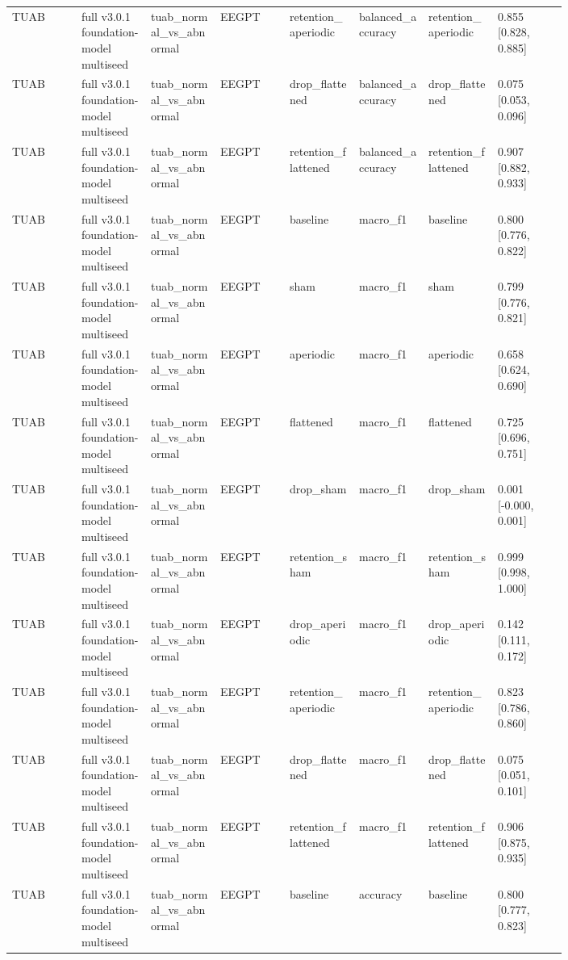 \begin{longtable}{p{0.10\linewidth}p{0.10\linewidth}p{0.10\linewidth}p{0.10\linewidth}p{0.10\linewidth}p{0.10\linewidth}p{0.10\linewidth}p{0.10\linewidth}}
TUAB & full v3.0.1 foundation-model multiseed & tuab\_normal\_vs\_abnormal & EEGPT & retention\_aperiodic & balanced\_accuracy & retention\_aperiodic & 0.855 [0.828, 0.885]\\
TUAB & full v3.0.1 foundation-model multiseed & tuab\_normal\_vs\_abnormal & EEGPT & drop\_flattened & balanced\_accuracy & drop\_flattened & 0.075 [0.053, 0.096]\\
TUAB & full v3.0.1 foundation-model multiseed & tuab\_normal\_vs\_abnormal & EEGPT & retention\_flattened & balanced\_accuracy & retention\_flattened & 0.907 [0.882, 0.933]\\
TUAB & full v3.0.1 foundation-model multiseed & tuab\_normal\_vs\_abnormal & EEGPT & baseline & macro\_f1 & baseline & 0.800 [0.776, 0.822]\\
TUAB & full v3.0.1 foundation-model multiseed & tuab\_normal\_vs\_abnormal & EEGPT & sham & macro\_f1 & sham & 0.799 [0.776, 0.821]\\
TUAB & full v3.0.1 foundation-model multiseed & tuab\_normal\_vs\_abnormal & EEGPT & aperiodic & macro\_f1 & aperiodic & 0.658 [0.624, 0.690]\\
TUAB & full v3.0.1 foundation-model multiseed & tuab\_normal\_vs\_abnormal & EEGPT & flattened & macro\_f1 & flattened & 0.725 [0.696, 0.751]\\
TUAB & full v3.0.1 foundation-model multiseed & tuab\_normal\_vs\_abnormal & EEGPT & drop\_sham & macro\_f1 & drop\_sham & 0.001 [-0.000, 0.001]\\
TUAB & full v3.0.1 foundation-model multiseed & tuab\_normal\_vs\_abnormal & EEGPT & retention\_sham & macro\_f1 & retention\_sham & 0.999 [0.998, 1.000]\\
TUAB & full v3.0.1 foundation-model multiseed & tuab\_normal\_vs\_abnormal & EEGPT & drop\_aperiodic & macro\_f1 & drop\_aperiodic & 0.142 [0.111, 0.172]\\
TUAB & full v3.0.1 foundation-model multiseed & tuab\_normal\_vs\_abnormal & EEGPT & retention\_aperiodic & macro\_f1 & retention\_aperiodic & 0.823 [0.786, 0.860]\\
TUAB & full v3.0.1 foundation-model multiseed & tuab\_normal\_vs\_abnormal & EEGPT & drop\_flattened & macro\_f1 & drop\_flattened & 0.075 [0.051, 0.101]\\
TUAB & full v3.0.1 foundation-model multiseed & tuab\_normal\_vs\_abnormal & EEGPT & retention\_flattened & macro\_f1 & retention\_flattened & 0.906 [0.875, 0.935]\\
TUAB & full v3.0.1 foundation-model multiseed & tuab\_normal\_vs\_abnormal & EEGPT & baseline & accuracy & baseline & 0.800 [0.777, 0.823]\\

\end{longtable}

